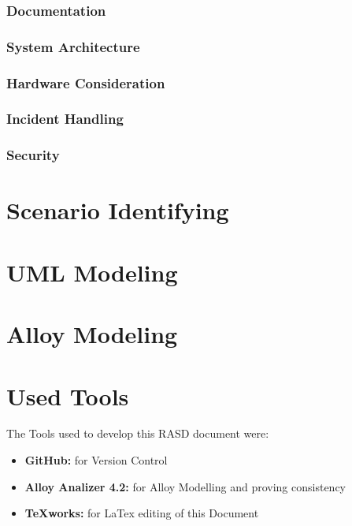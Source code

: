 \documentclass[a4paper]{article}
\begin{document}
\subsubsection{Documentation}
\subsubsection{System Architecture}
\subsubsection{Hardware Consideration}
\subsubsection{Incident Handling}
\subsubsection{Security}
\section{Scenario Identifying}

\section{UML Modeling}

\section{Alloy Modeling}
\newpage

\section{Used Tools}
The Tools used to develop this RASD document were:
\begin{itemize}
	\item \textbf{GitHub:} for Version Control
	\item \textbf{Alloy Analizer 4.2:} for Alloy Modelling and proving consistency 
	\item \textbf {TeXworks:} for LaTex editing of this Document
\end{itemize}
\newpage
\end{document}
